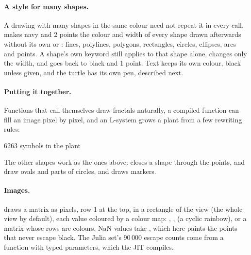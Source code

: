 \documentclass[11pt,a4paper,openany]{report}
\begin{document}
{{\paragraph{A style for many shapes.} A drawing with many shapes in the
same colour need not repeat it in every call.
 makes navy and 2 points the colour and width of
every shape drawn afterwards without its own  or
: lines, polylines, polygons, rectangles, circles, ellipses,
arcs and points. A shape's own keyword still applies to that shape alone,
 changes only the width, and
 goes back to black and 1 point. Text keeps its own
colour, black unless given, and the turtle has its own pen, described
next.

\paragraph{Putting it together.} Functions that call themselves draw
fractals naturally, a compiled function can fill an image pixel by pixel, and
an L-system grows a plant from a few rewriting rules:

\begin{axonout}
6263 symbols in the plant
\end{axonout}


The other shapes work as the ones above:  closes a
shape through the points,  and  draw ovals
and parts of circles, and  draws markers.

\paragraph{Images.}  draws a matrix as pixels, row 1 at
the top, in a rectangle of the view (the whole view by default), each value
coloured by a colour map: , ,  (a
cyclic rainbow), or a matrix whose rows are colours. NaN values take
, which here paints the points that never escape black. The
Julia set's 90\,000 escape counts come from a function with typed parameters,
which the JIT compiles.

}}
\end{document}
